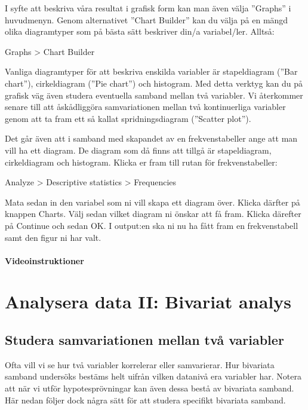 \documentclass[
]{book}
\begin{document}
I syfte att beskriva våra resultat i grafisk form kan man även välja ''Graphs'' i huvudmenyn. Genom
alternativet ''Chart Builder'' kan du välja på en mängd olika diagramtyper som på bästa sätt beskriver
din/a variabel/ler. Alltså:

Graphs \textgreater{} Chart Builder

Vanliga diagramtyper för att beskriva enskilda variabler är stapeldiagram (''Bar chart''), cirkeldiagram
(''Pie chart'') och histogram. Med detta verktyg kan du på grafisk väg även studera eventuella samband
mellan två variabler. Vi återkommer senare till att åskådliggöra samvariationen mellan två kontinuerliga
variabler genom att ta fram ett så kallat spridningsdiagram (''Scatter plot'').

Det går även att i samband med skapandet av en frekvenstabeller ange att man vill ha ett diagram. De diagram som då finns att tillgå är stapeldiagram, cirkeldiagram och histogram. Klicka er fram till rutan för frekvenstabeller:

Analyze \textgreater{} Descriptive statistics \textgreater{} Frequencies

Mata sedan in den variabel som ni vill skapa ett diagram över. Klicka därfter på knappen Charts. Välj sedan vilket diagram ni önskar att få fram. Klicka därefter på Continue och sedan OK. I output:en ska ni nu ha fått fram en frekvenstabell samt den figur ni har valt.

\hypertarget{videoinstruktioner-5}{%
\subsection{Videoinstruktioner}\label{videoinstruktioner-5}}

\hypertarget{part-analysera-data-ii-bivariat-analys}{%
\part*{Analysera data II: Bivariat analys}\label{part-analysera-data-ii-bivariat-analys}}

\hypertarget{studera-samvariationen-mellan-tvuxe5-variabler}{%
\chapter{Studera samvariationen mellan två variabler}\label{studera-samvariationen-mellan-tvuxe5-variabler}}

Ofta vill vi se hur två variabler korrelerar eller samvarierar. Hur bivariata samband undersöks bestäms helt uifrån vilken datanivå era variabler har. Notera att när vi utför hypotesprövningar kan även dessa bestå av bivariata samband. Här nedan följer dock några sätt för att studera specifikt bivariata samband.
\end{document}
